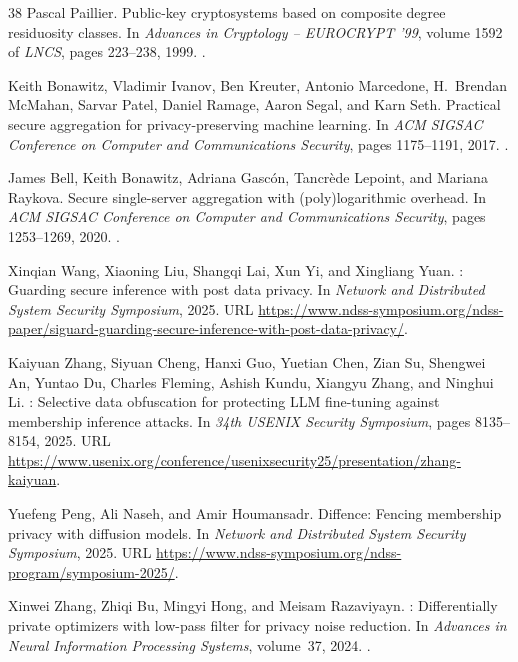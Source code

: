 \begin{thebibliography}{38}
Pascal Paillier.
\newblock Public-key cryptosystems based on composite degree residuosity
  classes.
\newblock In \emph{Advances in Cryptology -- EUROCRYPT '99}, volume 1592 of
  \emph{LNCS}, pages 223--238, 1999.
\newblock {}.

Keith Bonawitz, Vladimir Ivanov, Ben Kreuter, Antonio Marcedone, H.~Brendan
  McMahan, Sarvar Patel, Daniel Ramage, Aaron Segal, and Karn Seth.
\newblock Practical secure aggregation for privacy-preserving machine learning.
\newblock In \emph{ACM SIGSAC Conference on Computer and Communications
  Security}, pages 1175--1191, 2017.
\newblock {}.

James Bell, Keith Bonawitz, Adriana Gasc{\'o}n, Tancr{\`e}de Lepoint, and
  Mariana Raykova.
\newblock Secure single-server aggregation with (poly)logarithmic overhead.
\newblock In \emph{ACM SIGSAC Conference on Computer and Communications
  Security}, pages 1253--1269, 2020.
\newblock {}.

Xinqian Wang, Xiaoning Liu, Shangqi Lai, Xun Yi, and Xingliang Yuan.
: Guarding secure inference with post data privacy.
\newblock In \emph{Network and Distributed System Security Symposium}, 2025.
\newblock URL
  \url{https://www.ndss-symposium.org/ndss-paper/siguard-guarding-secure-inference-with-post-data-privacy/}.

Kaiyuan Zhang, Siyuan Cheng, Hanxi Guo, Yuetian Chen, Zian Su, Shengwei An,
  Yuntao Du, Charles Fleming, Ashish Kundu, Xiangyu Zhang, and Ninghui Li.
: Selective data obfuscation for protecting {LLM} fine-tuning
  against membership inference attacks.
\newblock In \emph{34th USENIX Security Symposium}, pages 8135--8154, 2025.
\newblock URL
  \url{https://www.usenix.org/conference/usenixsecurity25/presentation/zhang-kaiyuan}.

Yuefeng Peng, Ali Naseh, and Amir Houmansadr.
\newblock Diffence: Fencing membership privacy with diffusion models.
\newblock In \emph{Network and Distributed System Security Symposium}, 2025.
\newblock URL
  \url{https://www.ndss-symposium.org/ndss-program/symposium-2025/}.

Xinwei Zhang, Zhiqi Bu, Mingyi Hong, and Meisam Razaviyayn.
: Differentially private optimizers with low-pass filter for
  privacy noise reduction.
\newblock In \emph{Advances in Neural Information Processing Systems},
  volume~37, 2024.
\newblock {}.


\end{thebibliography}
